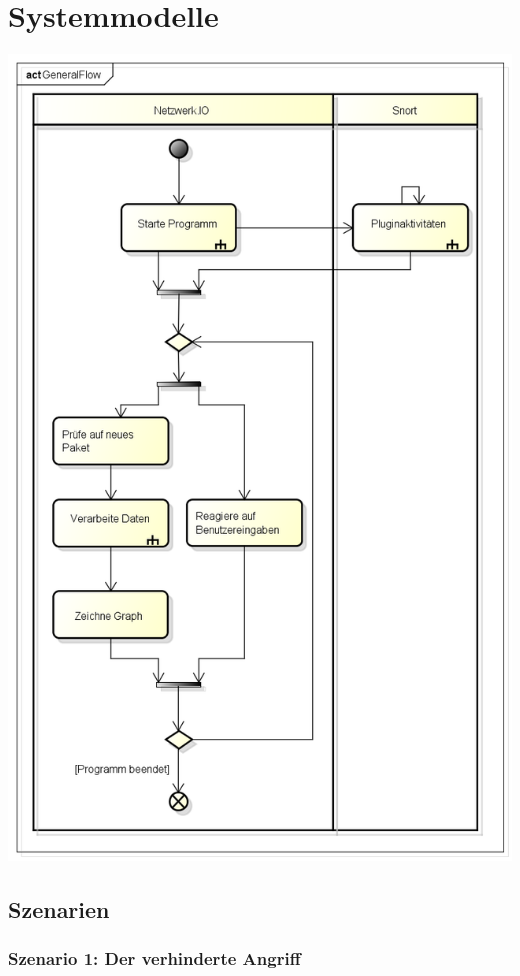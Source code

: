 \chapter{Systemmodelle}

\includegraphics[width=\textwidth]{GeneralFlow}

\section{Szenarien}

\subsection{Szenario 1: Der verhinderte Angriff}

